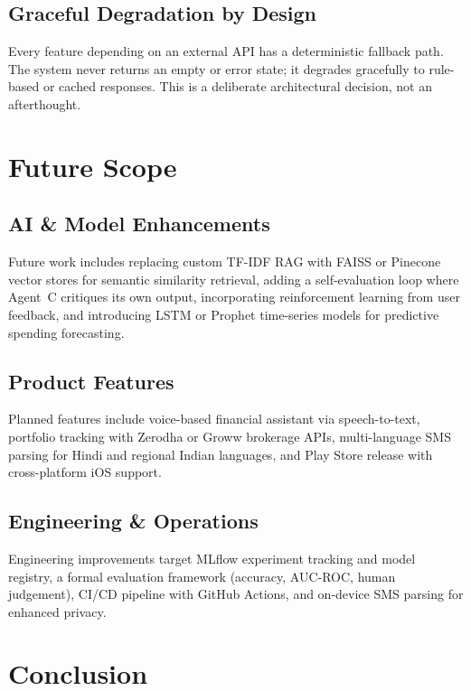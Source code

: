 \documentclass[conference]{IEEEtran}
\begin{document}
\subsection{Graceful Degradation by Design}
Every feature depending on an external API has a deterministic fallback path. The system never returns an empty or error state; it degrades gracefully to rule-based or cached responses. This is a deliberate architectural decision, not an afterthought.

\section{Future Scope}

\subsection{AI \& Model Enhancements}
Future work includes replacing custom TF-IDF RAG with FAISS or Pinecone vector stores for semantic similarity retrieval, adding a self-evaluation loop where Agent~C critiques its own output, incorporating reinforcement learning from user feedback, and introducing LSTM or Prophet time-series models for predictive spending forecasting.

\subsection{Product Features}
Planned features include voice-based financial assistant via speech-to-text, portfolio tracking with Zerodha or Groww brokerage APIs, multi-language SMS parsing for Hindi and regional Indian languages, and Play Store release with cross-platform iOS support.

\subsection{Engineering \& Operations}
Engineering improvements target MLflow experiment tracking and model registry, a formal evaluation framework (accuracy, AUC-ROC, human judgement), CI/CD pipeline with GitHub Actions, and on-device SMS parsing for enhanced privacy.

\section{Conclusion}
\end{document}
